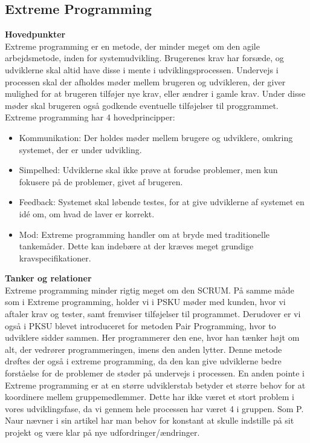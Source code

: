 \documentclass[a4paper]{article}
\begin{document}
\subsection{Extreme Programming}
\textbf{Hovedpunkter}\\
Extreme programming er en metode, der minder meget om den agile arbejdsmetode, inden for systemudvikling. Brugerenes krav har forsæde, og udviklerne skal altid have disse i mente i udviklingsprocessen. Undervejs i processen skal der afholdes møder mellem brugeren og udvikleren, der giver mulighed for at brugeren tilføjer nye krav, eller ændrer i gamle krav. Under disse møder skal brugeren også godkende eventuelle tilføjelser til proggrammet.\\
Extreme programming har 4 hovedprincipper:
\begin{itemize}
	\item Kommunikation: Der holdes møder mellem brugere og udviklere, omkring systemet, der er under udvikling.
	\item Simpelhed: Udviklerne skal ikke prøve at forudse problemer, men kun fokusere på de problemer, givet af brugeren.
	\item Feedback: Systemet skal løbende testes, for at give udviklerne af systemet en idé om, om hvad de laver er korrekt.
	\item Mod: Extreme programming handler om at bryde med traditionelle tankemåder. Dette kan indebære at der kræves meget grundige kravspecifikationer.
\end{itemize}
\textbf{Tanker og relationer}\\
Extreme programming minder rigtig meget om den SCRUM\cite{Scrum}. På samme måde som i Extreme programming, holder vi i PSKU møder med kunden, hvor vi aftaler krav og tester, samt fremviser tilføjelser til programmet. Derudover er vi også i PKSU blevet introduceret for metoden Pair Programming, hvor to udviklere sidder sammen. Her programmerer den ene, hvor han tænker højt om alt, der vedrører programmeringen, imens den anden lytter. Denne metode drøftes der også i extreme programming, da den kan give udviklerne bedre forståelse for de problemer de støder på undervejs i processen. En anden pointe i Extreme programming er at en større udviklerstab betyder et større behov for at koordinere mellem gruppemedlemmer. Dette har ikke været et stort problem i vores udviklingsfase, da vi gennem hele processen har været 4 i gruppen. Som P. Naur nævner i sin artikel\cite{NaurProgramming} har man behov for konstant at skulle indstille på sit projekt og være klar på nye udfordringer/ændringer.\\
\newpage
{}

\end{document}
